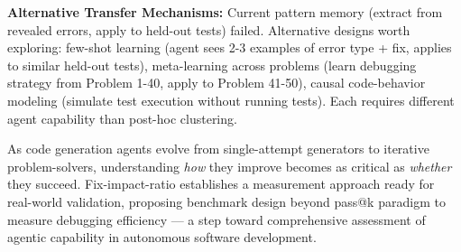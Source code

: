 \textbf{Alternative Transfer Mechanisms:} Current pattern memory (extract from revealed errors, apply to held-out tests) failed. Alternative designs worth exploring: few-shot learning (agent sees 2-3 examples of error type + fix, applies to similar held-out tests), meta-learning across problems (learn debugging strategy from Problem 1-40, apply to Problem 41-50), causal code-behavior modeling (simulate test execution without running tests). Each requires different agent capability than post-hoc clustering.

As code generation agents evolve from single-attempt generators to iterative problem-solvers, understanding \emph{how} they improve becomes as critical as \emph{whether} they succeed. Fix-impact-ratio establishes a measurement approach ready for real-world validation, proposing benchmark design beyond pass@k paradigm to measure debugging efficiency — a step toward comprehensive assessment of agentic capability in autonomous software development.
